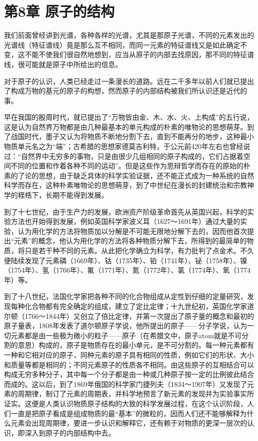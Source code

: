\chapter{第8章
原子的结构}

我们前面曾经讲到光谱，各种各样的光谱，尤其是那原子光谱，不同的元素发出的光谱线（特征谱线）竟是那么互不相同，而同一元素的特征谱线又是如此确定不变，这不能不使我们很自然地想到，应当从原子的内部去找原因，那不同的特征谱线，很可能就是原子中所给出的信息。

对于原子的认识，人类已经走过一条漫长的道路。远在二千多年以前人们就已提出了构成万物的基元的原子的构想，然而原子的内部结构被我们所认识还是近代的事。

早在我国的殷周时代，就已提出了``万物皆由金、木、水、火、上构成''的五行说，这是认为自然界万物都是由几种最基本的单元构成的朴素的唯物论的思想萌芽。到了战国时代，墨子又认为将物质不断地分割下去，直到不能再分的地步，这种最小物质单元名之为``端''；古希腊的思想家德莫吉利特，于公元前420年左右也曾经说过：``自然界中无穷多的事物，只是由很少几组相同的原子构成的，它们占据着空间不同的位置和作着各种不同的运动''。但是这些作为思辩哲学而存在的原始的朴素的了论的思想，由于缺乏具体的科学实验证据，还不能正式成为一种系统的自然科学而存在，这种朴素唯物论的思想萌芽，到了中世纪在漫长的封建统治和宗教神学的桎梏下，长期不能得到发展。

到了十七世纪，由于生产力的发展，欧洲资产阶级革命首先从英国兴起，科学的实验方法也开始得到发展，例如英国科学家波义耳（1627～1691年）通过大量的实验，认为用化学的方法将物质加以分解是不可能无限地分解下去的，因而他首次提出``元素''的概念，他认为用化学的方法将各种物质分解下去，所得到的最简单的物质，将只是若干种不同的元素。从此把化学确立为科学，有力批判了点金术。不久便陆续发现了元素磷（1669年）、钴（1735年）、铂（1741年）、铋（1758年）、镍（1754年）、氢（1766年）、氟（1771年）、氮（1772年）、氯（1774年）、氧（1774年）等。

到了十八世纪，法国化学家把各种不同的化合物组成从定性到仔细的定量研究，发现每种化合物都有完全确定的组成，建立了定比定律；十九世纪初，英国化学家道尔顿（1766～1844年）又创立了倍比定律，并第一次提出了原子量的概念和最初的原子量表，1808年发表了道尔顿原子学说，他所提出的原子------分子学说，认为一切元素都是由一些极为微小的粒子------原子（在希腊文中，原子atom就是不可分割的意思）构成的，原子是物质存在的最小单元，是不可分割的。每一种元素都有一种和它相对应的原子，同种元素的原子具有相同的性质，例如它们的形状、大小和质量等都是相同的；不同元素原子的性质各不相同。由这些原子的互相结合可以构成无穷多种分子，其中每一个分子都是由一种或几种原子按一定的比例彼此结合而成的。这以后，到了1869年俄国的科学家门捷列夫（1834～1907年）又发现了元素的周期律，制订了元素的周期表，并科学地预言了新元素的发现并为实验事实所证实。这便是人类认识物质原子结构的大致的科学发展过程，在这个认识阶段，人们一直是把原子看成是组成物质的最``基本''的微粒的，因而人们还不能够解释为什么元素会出现周期律，要进一步认识和解释它，还有赖于对物质的更深一层次的认识，即深入到原子的内部结构中去。

